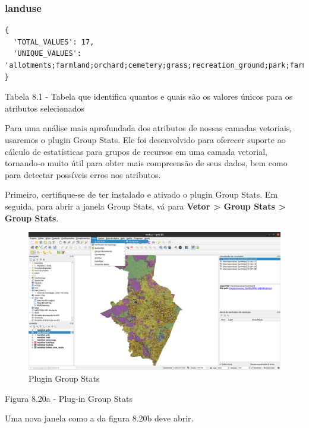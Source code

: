 \documentclass[
  portuguese,
]{krantz}
\begin{document}
\hypertarget{landuse}{%
\subsubsection{landuse}\label{landuse}}

\begin{verbatim}
{
  'TOTAL_VALUES': 17,
  'UNIQUE_VALUES': 'allotments;farmland;orchard;cemetery;grass;recreation_ground;park;farmyard;industrial;meadow;heath;commercial;forest;scrub;retail;military;residential'
}
\end{verbatim}

Tabela 8.1 - Tabela que identifica quantos e quais são os valores únicos para os atributos selecionados

Para uma análise mais aprofundada dos atributos de nossas camadas vetoriais, usaremos o plugin Group Stats. Ele foi desenvolvido para oferecer suporte ao cálculo de estatísticas para grupos de recursos em uma camada vetorial, tornando-o muito útil para obter mais compreensão de seus dados, bem como para detectar possíveis erros nos atributos.

Primeiro, certifique-se de ter instalado e ativado o plugin Group Stats. Em seguida, para abrir a janela Group Stats, vá para \textbf{Vetor \textgreater{} Group Stats \textgreater{} Group Stats}.

\begin{figure}
\centering
\includegraphics{media/modulo8/fig820_a.png}
\caption{Plugin Group Stats}
\end{figure}

Figura 8.20a - Plug-in Group Stats

Uma nova janela como a da figura 8.20b deve abrir.
\end{document}

